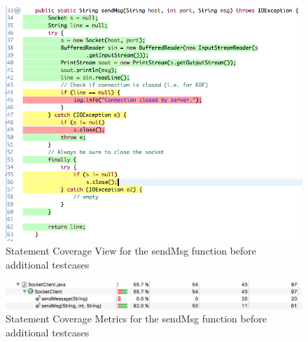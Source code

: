 \documentclass[fontsize=12pt,paper=letter,twoside]{scrartcl}
\begin{document}
\begin{figure}[!htb]
\begin{center}
\includegraphics[width=.99\textwidth]{images/wbt/bvt/figure1.png}
\end{center}
\caption{Statement Coverage View for the sendMsg function before additional testcases}
\label{fig:wbt_bvt_code}
\end{figure}
\begin{figure}[!htb]
\begin{center}
\includegraphics[width=.99\textwidth]{images/wbt/bvt/figure2.png}
\end{center}
\caption{Statement Coverage Metrics for the sendMsg function before additional testcases}
\label{fig:wbt_bvt_code}
\end{figure}
\end{document}
